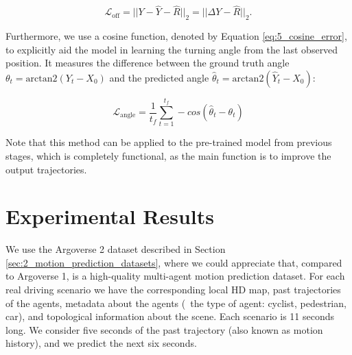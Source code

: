 \begin{equation}
	\label{eq:5_pose_error}
	\mathcal{L}_\text{off}= ||{Y} - \hat{Y} - \hat{R}||_2 = ||\Delta{Y} - \hat{R}||_2.
\end{equation}

Furthermore, we use a cosine function, denoted by Equation \ref{eq:5_cosine_error}, to explicitly aid the model in learning the turning angle from the last observed position. It measures the difference between the ground truth angle $\theta_{t}= \text{arctan2}(Y_{t}-{X}_{0})$ and the predicted angle $\hat{\theta}_{t}= \text{arctan2}(\hat{Y}_{t}-{X}_{0})$:

\begin{equation}
	\mathcal{L}_{\text{angle}}=\frac{1}{t_{f}}\sum^{t_{f}}_{t=1}-cos(\hat{\theta}_{t}-\theta_{t})
	\label{eq:5_cosine_error}
\end{equation}

Note that this method can be applied to the pre-trained model from previous stages, which is completely functional, as the main function is to improve the output trajectories.

\section{Experimental Results}
\label{sec:7_experimental_results}

We use the Argoverse 2 \cite{wilson2023argoverse} dataset described in Section \ref{sec:2_motion_prediction_datasets}, where we could appreciate that, compared to Argoverse 1, is a high-quality multi-agent motion prediction dataset. For each real driving scenario we have the corresponding local HD map, past trajectories of the agents, metadata about the agents (\eg \ the type of agent: cyclist, pedestrian, car), and topological information about the scene. Each scenario is 11 seconds long. We consider five seconds of the past trajectory (also known as motion history), and we predict the next six seconds. 


